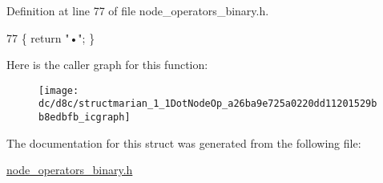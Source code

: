 Definition at line 77 of file node\+\_\+operators\+\_\+binary.\+h.


\begin{DoxyCode}
77 \{ \textcolor{keywordflow}{return} \textcolor{stringliteral}{"•"}; \}
\end{DoxyCode}


Here is the caller graph for this function\+:
\nopagebreak
\begin{figure}[H]
\begin{center}
\leavevmode
\texttt{[image: dc/d8c/structmarian\_1\_1DotNodeOp\_a26ba9e725a0220dd11201529bb8edbfb\_icgraph]}
\end{center}
\end{figure}




The documentation for this struct was generated from the following file\+:\begin{DoxyCompactItemize}
\item 
\hyperlink{node__operators__binary_8h}{node\+\_\+operators\+\_\+binary.\+h}\end{DoxyCompactItemize}
